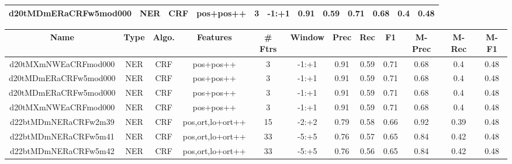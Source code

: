 \documentclass[a4paper]{article}
\begin{document}
\begin{landscape}
\begin{center}
\begin{tabular}{ |c|c|c|c|c|c|c|c|c|c|c|c|}
 
 	
 	\small{ d20tMDmERaCRFw5mod000 } & \small{ NER} & \small{  CRF }  & pos+pos++  &  3 &  \small{  -1:+1 }  &  0.91 & 0.59 & 0.71  &  0.68 & 0.4 & 0.48 \\
 	
 \hline
\end{tabular}
\end{center}




\begin{center}
\begin{tabular}{ |c|c|c|c|c|c|c|c|c|c|c|c|} 
 \hline
 	Name & Type & Algo. & Features & \# Ftrs & Window & Prec & Rec & F1 & M-Prec & M-Rec & M-F1\\
 \hline

 	

 
 	
 	\small{ d20tMXmNWEaCRFmod000 } & \small{ NER} & \small{  CRF }  & pos+pos++  &  3 &  \small{  -1:+1 }  &  0.91 & 0.59 & 0.71  &  0.68 & 0.4 & 0.48 \\
 	

 
 	
 	\small{ d20tMDmERaCRFw5mod000 } & \small{ NER} & \small{  CRF }  & pos+pos++  &  3 &  \small{  -1:+1 }  &  0.91 & 0.59 & 0.71  &  0.68 & 0.4 & 0.48 \\
 	

 
 	
 	\small{ d20tMDmERaCRFw5mod000 } & \small{ NER} & \small{  CRF }  & pos+pos++  &  3 &  \small{  -1:+1 }  &  0.91 & 0.59 & 0.71  &  0.68 & 0.4 & 0.48 \\
 	

 
 	
 	\small{ d20tMXmNWEaCRFmod000 } & \small{ NER} & \small{  CRF }  & pos+pos++  &  3 &  \small{  -1:+1 }  &  0.91 & 0.59 & 0.71  &  0.68 & 0.4 & 0.48 \\
 	

 
 	
 	\small{ d22btMDmNERaCRFw2m39 } & \small{ NER} & \small{  CRF }  & pos,ort,lo+ort++  &  15 &  \small{  -2:+2 }  &  0.79 & 0.58 & 0.66  &  0.92 & 0.39 & 0.48 \\
 	

 
 	
 	\small{ d22btMDmNERaCRFw5m41 } & \small{ NER} & \small{  CRF }  & pos,ort,lo+ort++  &  33 &  \small{  -5:+5 }  &  0.76 & 0.57 & 0.65  &  0.84 & 0.42 & 0.48 \\
 	

 
 	
 	\small{ d22btMDmNERaCRFw5m42 } & \small{ NER} & \small{  CRF }  & pos,ort,lo+ort++  &  33 &  \small{  -5:+5 }  &  0.76 & 0.56 & 0.65  &  0.84 & 0.42 & 0.48 \\
 	


\end{tabular}
\end{center}
\end{landscape}
\end{document}
